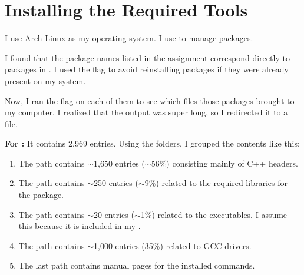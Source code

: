 

\renewcommand{\TemplateStatus}{template}
\renewcommand{\HomeworkTitle}{Preliminaries}
\renewcommand{\HomeworkSubtitle}{}
\renewcommand{\SubmissionDate}{\today}



\section{Installing the Required Tools}
I use Arch Linux as my operating system.
I use  to manage packages.

I found that the package names listed in the assignment correspond directly to packages in .
I used the  flag to avoid reinstalling packages if they were already present on my system.

\begin{terminal}
\end{terminal}

Now, I ran the  flag on each of them to see which files those packages brought to my computer.
I realized that the output was super long, so I redirected it to a file.

\begin{terminal}
\end{terminal}

\textbf{For :} It contains 2,969 entries.
Using the folders, I grouped the contents like this:
\begin{enumerate}
    \item The path  contains \(\sim\)1,650 entries (\(\sim\)56\%) consisting mainly of C++ headers.
    \item The path  contains \(\sim\)250 entries (\(\sim\)9\%) related to the required libraries for the package.
    \item The path  contains \(\sim\)20 entries (\(\sim\)1\%) related to the executables.
    I assume this because it is included in my .
    \item The path  contains \(\sim\)1,000 entries (35\%) related to GCC drivers.
    \item The last path  contains manual pages for the installed commands.
\end{enumerate}

